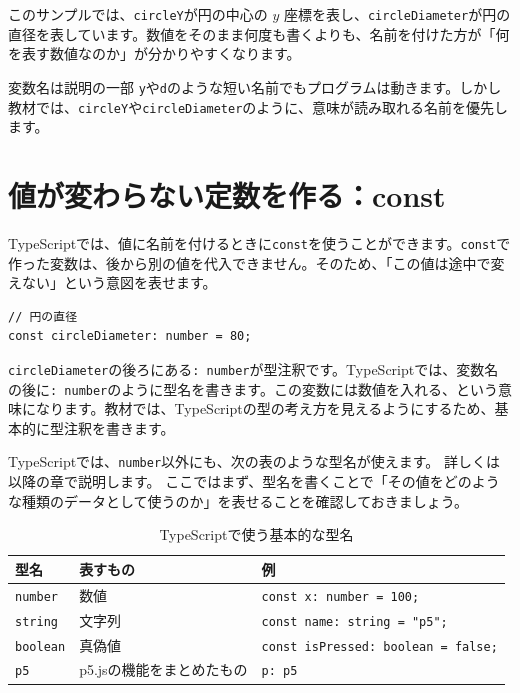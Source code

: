 このサンプルでは、\texttt{circleY}が円の中心の $y$ 座標を表し、\texttt{circleDiameter}が円の直径を表しています。数値をそのまま何度も書くよりも、名前を付けた方が「何を表す数値なのか」が分かりやすくなります。

\begin{pointbox}{変数名は説明の一部}
\texttt{y}や\texttt{d}のような短い名前でもプログラムは動きます。しかし教材では、\texttt{circleY}や\texttt{circleDiameter}のように、意味が読み取れる名前を優先します。
\end{pointbox}

\section{値が変わらない定数を作る：const}

TypeScriptでは、値に名前を付けるときに\texttt{const}を使うことができます。\texttt{const}で作った変数は、後から別の値を代入できません。そのため、「この値は途中で変えない」という意図を表せます。

\begin{listing}[htbp]
\begin{verbatim}
// 円の直径
const circleDiameter: number = 80;
\end{verbatim}
\caption{constとnumber型注釈}
\label{lst:chapter04-const-number}
\end{listing}

\texttt{circleDiameter}の後ろにある\texttt{: number}が型注釈です。TypeScriptでは、変数名の後に\texttt{: number}のように型名を書きます。この変数には数値を入れる、という意味になります。教材では、TypeScriptの型の考え方を見えるようにするため、基本的に型注釈を書きます。

TypeScriptでは、\texttt{number}以外にも、次の表のような型名が使えます。
詳しくは以降の章で説明します。
ここではまず、型名を書くことで「その値をどのような種類のデータとして使うのか」を表せることを確認しておきましょう。

\begin{table}[htbp]
    \centering
    \caption{TypeScriptで使う基本的な型名}
    \label{tab:chapter04-basic-types}
    \begin{tabular}{lll}
        \toprule
        型名 & 表すもの & 例 \\
        \midrule
        \texttt{number} & 数値 & \texttt{const x: number = 100;} \\
        \texttt{string} & 文字列 & \texttt{const name: string = "p5";} \\
        \texttt{boolean} & 真偽値 & \texttt{const isPressed: boolean = false;} \\
        \texttt{p5} & p5.jsの機能をまとめたもの & \texttt{p: p5} \\
        \bottomrule
    \end{tabular}
\end{table}

